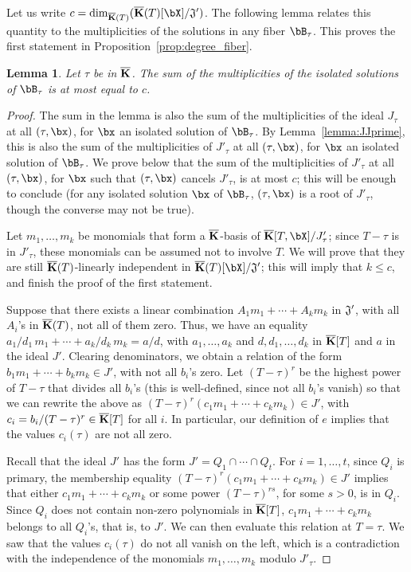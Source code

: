 \documentclass[12pt]{article}
\newtheorem{lemma}[definition]{Lemma}
\begin{document}
Let us write $c=\dim_{\KKbar(T)}(\KKbar(T)[\bX]/{\frak J}')$.  The
following lemma relates this quantity to the multiplicities of the
solutions in any fiber $\bB_\tau$. This proves the first statement
in Proposition~\ref{prop:degree_fiber}.

\begin{lemma}\label{lemma:19}
  Let $\tau$ be in $\overline{\mathbf{K}}$. The sum of the multiplicities of the
  isolated solutions of $\bB_\tau$ is at most equal to $c$.
\end{lemma}
\begin{proof}
  The sum in the lemma is also the sum of the multiplicities of the
  ideal $J_\tau$ at all $(\tau,\bx)$, for $\bx$ an isolated solution of
  $\bB_\tau$.  By Lemma~\ref{lemma:JJprime}, this is also the sum of
  the multiplicities of $J'_\tau$ at all $(\tau,\bx)$, for $\bx$ an
  isolated solution of $\bB_\tau$. We prove below that the sum of the
  multiplicities of $J'_\tau$ at all $(\tau,\bx)$, for $\bx$ such that
  $(\tau,\bx)$ cancels $J'_\tau$, is at most $c$; this will be enough
  to conclude (for any isolated solution $\bx$ of $\bB_\tau$,
  $(\tau,\bx)$ is a root of $J'_\tau$, though the converse may not be
  true).
  
  Let $m_1,\dots,m_k$ be monomials that form a $\overline{\mathbf{K}}$-basis of
  $\KKbar[T,\bX]/J'_\tau$; since $T-\tau$ is in $J'_\tau$, these
  monomials can be assumed not to involve $T$.  We will prove that
  they are still $\overline{\mathbf{K}}(T)$-linearly independent in
  $\KKbar(T)[\bX]/{\frak J}'$; this will imply that $k \le c$,
  and finish the proof of the first statement.
  
  Suppose that there exists a linear combination $A_1 m_1 + \cdots +
  A_k m_k$ in ${\frak J}'$, with all $A_i$'s in $\overline{\mathbf{K}}(T)$, not
  all of them zero. Thus, we have an equality $a_1/d_1\, m_1 + \cdots
  + a_k/d_k\, m_k = a/d$, with $a_1,\dots,a_k$ and
  $d,d_1,\dots,d_k$ in $\overline{\mathbf{K}}[T]$ and $a$ in the ideal
  $J'$. Clearing denominators, we obtain a relation of the form $b_1
  m_1 +\cdots+ b_k m_k \in J'$, with not all $b_i$'s zero. Let
  $(T-\tau)^r$ be the highest power of $T-\tau$ that divides all
  $b_i$'s (this is well-defined, since not all $b_i$'s vanish) so that
  we can rewrite the above as $(T-\tau)^r (c_1 m_1 +\cdots+ c_k
  m_k) \in J'$, with $c_i=b_i/(T-\tau)^r \in \overline{\mathbf{K}}[T]$ for all $i$.
  In particular, our definition of $e$ implies that the values
  $c_i(\tau)$ are not all zero.

  Recall that the ideal $J'$ has the form $J'=Q_1 \cap \cdots \cap
  Q_t$. For $i=1,\dots,t$, since $Q_i$ is primary, the membership
  equality $(T-\tau)^r (c_1 m_1 +\cdots +c_k m_k) \in J'$ implies
  that either $c_1 m_1 +\cdots +c_k m_k$ or some power
  $(T-\tau)^{rs}$, for some $s > 0$, is in $Q_i$. Since $Q_i$ does not
  contain non-zero polynomials in $\overline{\mathbf{K}}[T]$, $c_1 m_1 +\cdots+ c_k
  m_k$ belongs to all $Q_i$'s, that is, to $J'$. We can then
  evaluate this relation at $T=\tau$. We saw that the values
  $c_i(\tau)$ do not all vanish on the left, which is a contradiction
  with the independence of the monomials $m_1,\dots,m_k$ modulo
  $J'_\tau$.
\end{proof}
\end{document}
